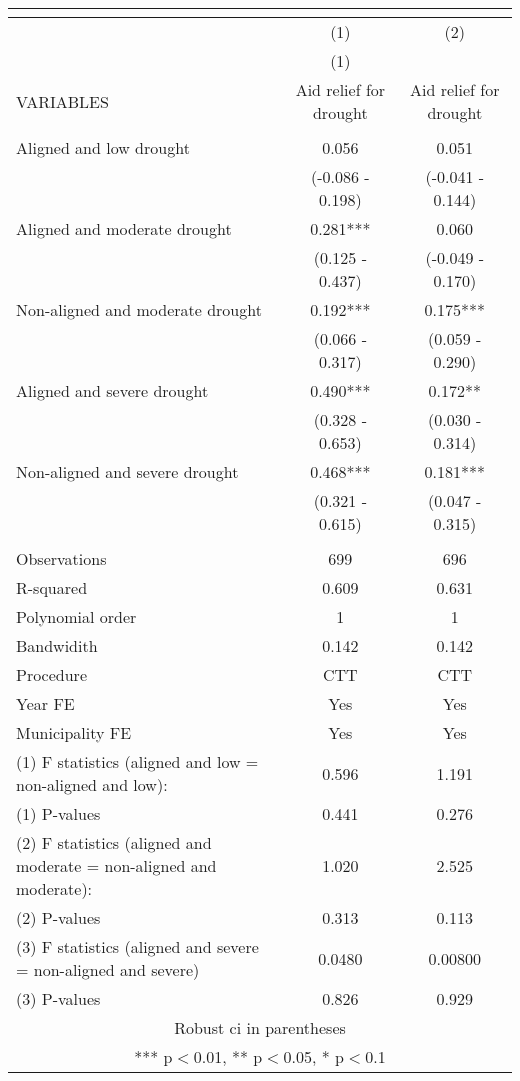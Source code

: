\begin{tabular}{lcc}
\multicolumn{3}{c}{} \\ \hline
 & (1) & (2) \\
 & (1) &  \\
VARIABLES & Aid relief for drought & Aid relief for drought \\ \hline
 &  &  \\
Aligned and low drought & 0.056 & 0.051 \\
 & (-0.086 - 0.198) & (-0.041 - 0.144) \\
Aligned and moderate drought & 0.281*** & 0.060 \\
 & (0.125 - 0.437) & (-0.049 - 0.170) \\
Non-aligned and moderate drought & 0.192*** & 0.175*** \\
 & (0.066 - 0.317) & (0.059 - 0.290) \\
Aligned and severe drought & 0.490*** & 0.172** \\
 & (0.328 - 0.653) & (0.030 - 0.314) \\
Non-aligned and severe drought & 0.468*** & 0.181*** \\
 & (0.321 - 0.615) & (0.047 - 0.315) \\
 &  &  \\
Observations & 699 & 696 \\
R-squared & 0.609 & 0.631 \\
Polynomial order & 1 & 1 \\
Bandwidith & 0.142 & 0.142 \\
Procedure & CTT & CTT \\
Year FE & Yes & Yes \\
Municipality FE & Yes & Yes \\
(1) F statistics (aligned and low = non-aligned and low): & 0.596 & 1.191 \\
(1) \hspace{1mm} P-values & 0.441 & 0.276 \\
(2) F statistics (aligned and moderate = non-aligned and moderate): & 1.020 & 2.525 \\
(2) \hspace{1mm} P-values & 0.313 & 0.113 \\
(3) F statistics (aligned and severe = non-aligned and severe) & 0.0480 & 0.00800 \\
 (3) \hspace{1mm} P-values & 0.826 & 0.929 \\ \hline
\multicolumn{3}{c}{ Robust ci in parentheses} \\
\multicolumn{3}{c}{ *** p$<$0.01, ** p$<$0.05, * p$<$0.1} \\
\end{tabular}
